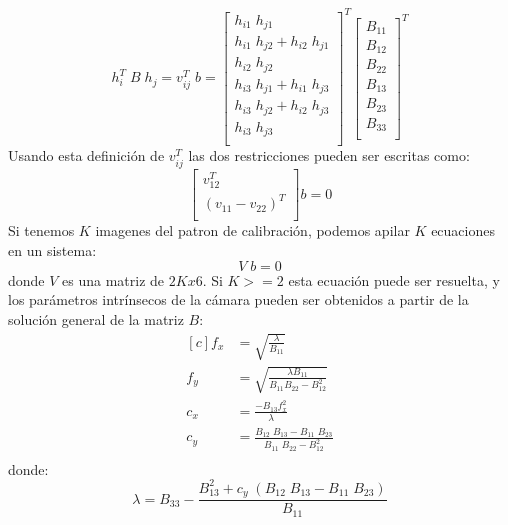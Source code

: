 \begin{equation*}
	h_i^T \; B \; h_j = v_{ij}^T \; b =
	\begin{bmatrix}
    h_{i1} \; h_{j1}\\
    h_{i1} \; h_{j2} + h_{i2} \; h_{j1} \\
    h_{i2} \; h_{j2}\\
    h_{i3} \; h_{j1} + h_{i1} \; h_{j3} \\
    h_{i3} \; h_{j2} + h_{i2} \; h_{j3} \\
    h_{i3} \; h_{j3}\\
	\end{bmatrix}^T
	\begin{bmatrix}
    B_{11} \\
    B_{12} \\
    B_{22} \\
    B_{13} \\
    B_{23} \\
    B_{33} \\
	\end{bmatrix}^T
\end{equation*}
Usando esta definición de $v_{ij}^T$ las dos restricciones pueden ser escritas como:
\begin{equation*}
	\begin{bmatrix}
    v_{12}^T \\
    (v_{11} - v_{22})^T\\
	\end{bmatrix}
	b = 0
\end{equation*}
Si tenemos $K$ imagenes del patron de calibración, podemos apilar $K$ ecuaciones en un sistema:
\begin{equation*}
    V \; b = 0
\end{equation*}
donde $V$ es una matriz de $2K x 6$. Si $K >= 2$ esta ecuación puede ser resuelta, y los parámetros intrínsecos de la cámara pueden ser obtenidos a partir de la solución general de la matriz $B$:
\begin{equation*}
\begin{aligned}[c]
    f_x &= \sqrt{\frac{\lambda}{B_{11}}} \\
    f_y &= \sqrt{\frac{\lambda B_{11}}{B_{11} B_{22} - B_{12}^2}} \\
    c_x &= \frac{-B_{13} f_x^2}{\lambda} \\
    c_y &= \frac{B_{12} \; B_{13} - B_{11} \; B_{23}}{B_{11} \; B_{22} - B_{12}^2} \\
\end{aligned}
\end{equation*}
donde:
\begin{equation*}
    \lambda = B_{33} - \frac{B_{13}^2 + c_y \; (B_{12} \; B_{13} - B_{11} \; B_{23})}{B_{11}}
\end{equation*}

